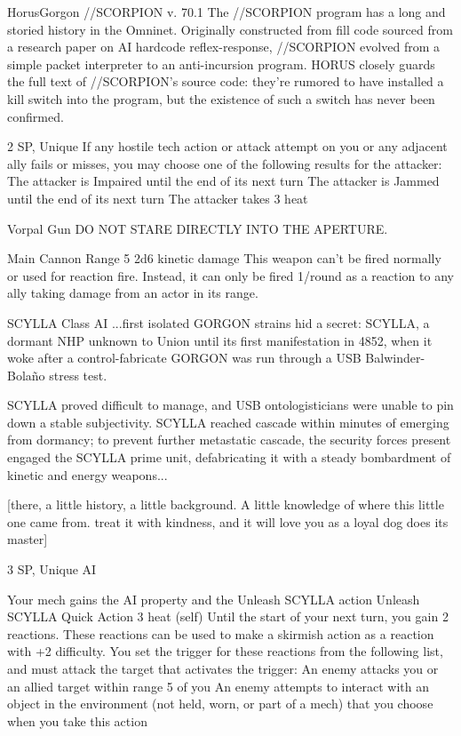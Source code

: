\begin{mech}{Horus}{Gorgon}
//SCORPION v. 70.1
The //SCORPION program has a long and storied history in the Omninet. Originally constructed from fill code sourced from a research paper on AI hardcode reflex-response, //SCORPION evolved from a simple packet interpreter to an anti-incursion program. HORUS closely guards the full text of //SCORPION’s source code: they’re rumored to have installed a kill switch into the program, but the existence of such a switch has never been confirmed.  

2 SP, Unique
If any hostile tech action or attack attempt on you or any adjacent ally fails or misses, you may choose one of the following results for the attacker:
The attacker is Impaired until the end of its next turn
The attacker is Jammed until the end of its next turn
The attacker takes 3 heat

Vorpal Gun
DO NOT STARE DIRECTLY INTO THE APERTURE.

Main Cannon
Range 5
2d6 kinetic damage
This weapon can’t be fired normally or used for reaction fire. Instead, it can only be fired 1/round as a reaction to any ally taking damage from an actor in its range.

SCYLLA Class AI
...first isolated GORGON strains hid a secret: SCYLLA, a dormant NHP unknown to Union until its first manifestation in 4852, when it woke after a control-fabricate GORGON was run through a USB Balwinder-Bolaño stress test. 

SCYLLA proved difficult to manage, and USB ontologisticians were unable to pin down a stable subjectivity. SCYLLA reached cascade within minutes of emerging from dormancy; to prevent further metastatic cascade, the security forces present engaged the SCYLLA prime unit, defabricating it with a steady bombardment of kinetic and energy weapons...

[there, a little history, a little background. A little knowledge of where this little one came from. treat it with kindness, and it will love you as a loyal dog does its master]  

3 SP, Unique
AI

Your mech gains the AI property and the Unleash SCYLLA action
Unleash SCYLLA
Quick Action
  	3 heat (self)
Until the start of your next turn, you gain 2 reactions. These reactions can be used to make a skirmish action as a reaction with +2 difficulty. You set the trigger for these reactions from the following list, and must attack the target that activates the trigger:
An enemy attacks you or an allied target within range 5 of you
An enemy attempts to interact with an object in the environment (not held, worn, or part of a mech) that you choose when you take this action


\end{mech}
